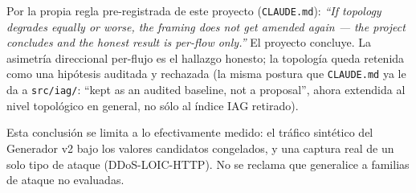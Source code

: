 \documentclass[11pt]{article}
\newcommand{\code}[1]{\texttt{\small #1}}
\begin{document}
Por la propia regla pre-registrada de este proyecto (\code{CLAUDE.md}): \textit{``If
topology degrades equally or worse, the framing does not get amended again --- the project
concludes and the honest result is per-flow only.''} El proyecto concluye. La asimetría
direccional per-flujo es el hallazgo honesto; la topología queda retenida como una
hipótesis auditada y rechazada (la misma postura que \code{CLAUDE.md} ya le da a
\code{src/iag/}: ``kept as an audited baseline, not a proposal'', ahora extendida al nivel
topológico en general, no sólo al índice IAG retirado).

Esta conclusión se limita a lo efectivamente medido: el tráfico sintético del Generador v2
bajo los valores candidatos congelados, y una captura real de un solo tipo de ataque
(DDoS-LOIC-HTTP). No se reclama que generalice a familias de ataque no evaluadas.
\end{document}
